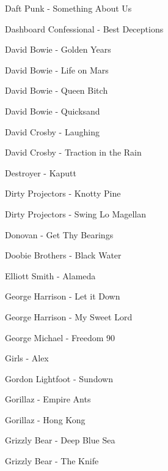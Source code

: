 Daft Punk - Something About Us \dotfill \pageref{Something About Us - Daft Punk} 

Dashboard Confessional - Best Deceptions \dotfill \pageref{Best Deceptions - Dashboard Confessional} 

David Bowie - Golden Years \dotfill \pageref{Golden Years - David Bowie} 

David Bowie - Life on Mars \dotfill \pageref{Life on Mars - David Bowie} 

David Bowie - Queen Bitch \dotfill \pageref{Queen Bitch - David Bowie} 

David Bowie - Quicksand \dotfill \pageref{Quicksand - David Bowie} 

David Crosby - Laughing \dotfill \pageref{Laughing - David Crosby} 

David Crosby - Traction in the Rain \dotfill \pageref{Traction in the Rain - David Crosby} 

Destroyer - Kaputt \dotfill \pageref{Kaputt - Destroyer} 

Dirty Projectors - Knotty Pine \dotfill \pageref{Knotty Pine - Dirty Projectors} 

Dirty Projectors - Swing Lo Magellan \dotfill \pageref{Swing Lo Magellan - Dirty Projectors} 

Donovan - Get Thy Bearings \dotfill \pageref{Get Thy Bearings - Donovan} 

Doobie Brothers - Black Water \dotfill \pageref{Black Water - Doobie Brothers} 

Elliott Smith - Alameda \dotfill \pageref{Alameda - Elliott Smith} 

George Harrison - Let it Down \dotfill \pageref{Let it Down - George Harrison} 

George Harrison - My Sweet Lord \dotfill \pageref{My Sweet Lord - George Harrison} 

George Michael - Freedom 90 \dotfill \pageref{Freedom 90 - George Michael} 

Girls - Alex \dotfill \pageref{Alex - Girls} 

Gordon Lightfoot - Sundown \dotfill \pageref{Sundown - Gordon Lightfoot} 

Gorillaz - Empire Ants \dotfill \pageref{Empire Ants - Gorillaz} 

Gorillaz - Hong Kong \dotfill \pageref{Hong Kong - Gorillaz} 

Grizzly Bear - Deep Blue Sea \dotfill \pageref{Deep Blue Sea - Grizzly Bear} 

Grizzly Bear - The Knife \dotfill \pageref{The Knife - Grizzly Bear} 

